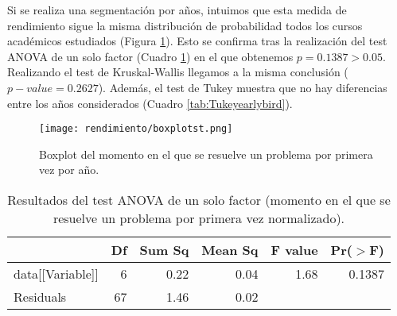 Si se realiza una segmentación por años, intuimos que esta medida de rendimiento sigue la misma distribución de probabilidad todos los cursos académicos estudiados (Figura \ref{fig:boxplotearlybird}). Esto se confirma tras la realización del test ANOVA de un solo factor (Cuadro \ref{tab:ANOVAearlybird}) en el que obtenemos $p = 0.1387 > 0.05$. Realizando el test de Kruskal-Wallis llegamos a la misma conclusión ($p-value = 0.2627$). Además, el test de Tukey muestra que no hay diferencias entre los años considerados (Cuadro \ref{tab:Tukeyearlybird}).

\begin{figure}[H]
    \centering
    \texttt{[image: rendimiento/boxplotst.png]}
    \caption{Boxplot del momento en el que se resuelve un problema por primera vez por año.}
    \label{fig:boxplotearlybird}
\end{figure}

\begin{table}[H]
\centering
\caption{Resultados del test ANOVA de un solo factor (momento en el que se resuelve un problema por primera vez normalizado).}
\label{tab:ANOVAearlybird}
\begin{tabular}{lrrrrr}
  \hline
 & Df & Sum Sq & Mean Sq & F value & Pr($>$F) \\ 
  \hline
data[[Variable]] & 6 & 0.22 & 0.04 & 1.68 & 0.1387 \\ 
  Residuals            & 67 & 1.46 & 0.02 &  &  \\ 
   \hline
\end{tabular}
\end{table}

